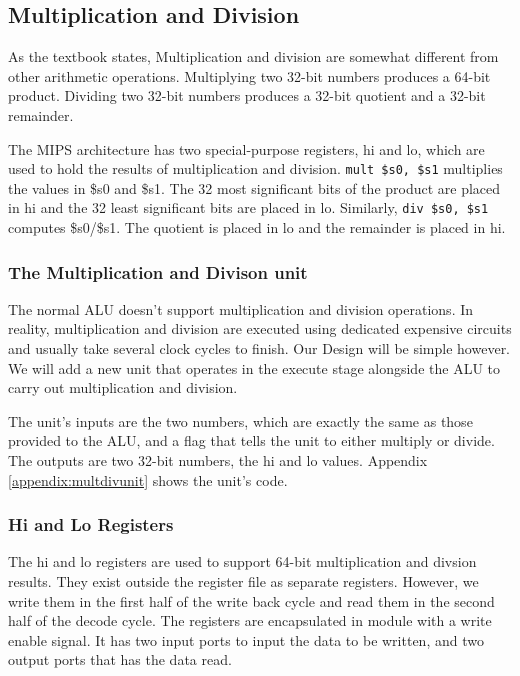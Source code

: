 \documentclass[titlepage,12pt,oneside,a4paper]{article}
\newcommand{\code}[1]{{\texttt{#1}}}
\begin{document}
\subsection{Multiplication and Division}
As the textbook states, Multiplication and division are somewhat different from other arithmetic operations. Multiplying two 32-bit numbers produces a 64-bit product. Dividing two 32-bit numbers produces a 32-bit quotient and a 32-bit remainder.

The MIPS architecture has two special-purpose registers, hi and lo, which are used to hold the results of multiplication and division. \code{mult \$s0, \$s1} multiplies the values in \$s0 and \$s1. The 32 most significant bits of the product are placed in hi and the 32 least significant bits are placed in lo. Similarly, \code{div \$s0, \$s1} computes \$s0/\$s1. The quotient is placed in lo and the remainder is placed in hi.

\subsubsection{The Multiplication and Divison unit}
The normal ALU doesn't support multiplication and division operations. In reality, multiplication and division are executed using dedicated expensive circuits and usually take several clock cycles to finish. Our Design will be simple however. We will add a new unit that operates in the execute stage alongside the ALU to carry out multiplication and division.

The unit's inputs are the two numbers, which are exactly the same as those provided to the ALU, and a flag that tells the unit to either multiply or divide. The outputs are two 32-bit numbers, the hi and lo values. Appendix \ref{appendix:multdivunit} shows the unit's code.

\subsubsection{Hi and Lo Registers}
The hi and lo registers are used to support 64-bit multiplication and divsion results. They exist outside the register file as separate registers. However, we write them in the first half of the write back cycle and read them in the second half of the decode cycle. The registers are encapsulated in module with a write enable signal. It has two input ports to input the data to be written, and two output ports that has the data read.
\end{document}
